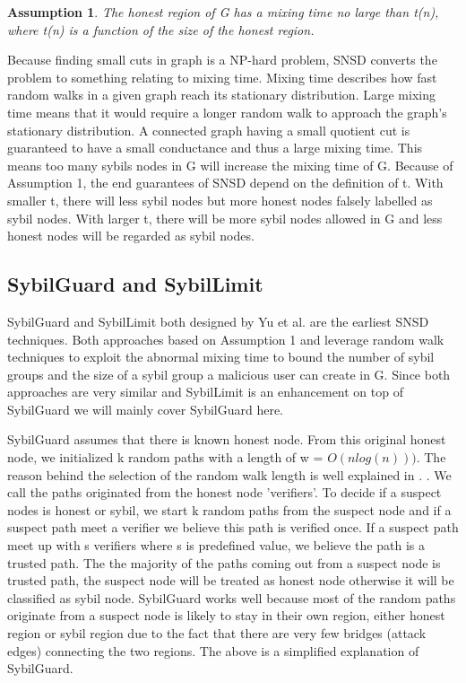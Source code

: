 \documentclass[conference]{IEEEtran}
\newtheorem{assumption}{Assumption}
\begin{document}
\begin{assumption}
The honest region of G has a mixing time no large than t(n), where t(n) is a function of the size of the honest region. \cite{yu11sybildefensesurvey}
\end{assumption}

Because finding small cuts in graph is a NP-hard problem, SNSD converts the problem to something relating to mixing time. Mixing time describes how fast random walks in a given graph reach its stationary distribution. Large mixing time means that it would require a longer random walk to approach the graph's stationary distribution. A connected graph having a small quotient cut is guaranteed to have a small conductance and thus a large mixing time. This means too many sybils nodes in G will increase the mixing time of G. Because of Assumption 1, the end guarantees of SNSD depend on the definition of t. With smaller t, there will less sybil nodes but more honest nodes falsely labelled as sybil nodes. With larger t, there will be more sybil nodes allowed in G and less honest nodes will be regarded as sybil nodes. \cite{yu11sybildefensesurvey}

\subsection{SybilGuard and SybilLimit}
SybilGuard\cite{Yu08SybilGuard} and SybilLimit\cite{Yu08SybilLimit} both designed by Yu et al.  are the earliest SNSD techniques. Both approaches based on Assumption 1 and leverage random walk techniques to exploit the abnormal mixing time to bound the number of sybil groups and the size of a sybil group a malicious user can create in G. Since both approaches are very similar and SybilLimit is an enhancement on top of SybilGuard we will mainly cover SybilGuard here.

SybilGuard assumes that there is known honest node. From this original honest node, we initialized k random paths with a length of w = $O(nlog(n)))$. The reason behind the selection of the random walk length is well explained in \cite{Yu08SybilGuard}. . We call the paths originated from the honest node 'verifiers'. To decide if a suspect nodes is honest or sybil, we start k random paths from the suspect node and if a suspect path meet a verifier we believe this path is verified once. If a suspect path meet up with s verifiers where s is predefined value, we believe the path is a trusted path. The the majority of the paths coming out from a suspect node is trusted path, the suspect node will be treated as honest node otherwise it will be classified as sybil node. SybilGuard works well because most of the random paths originate from a suspect node is likely to stay in their own region, either honest region or sybil region due to the fact that there are very few bridges (attack edges) connecting the two regions. The above is a simplified explanation of SybilGuard. 
\end{document}
